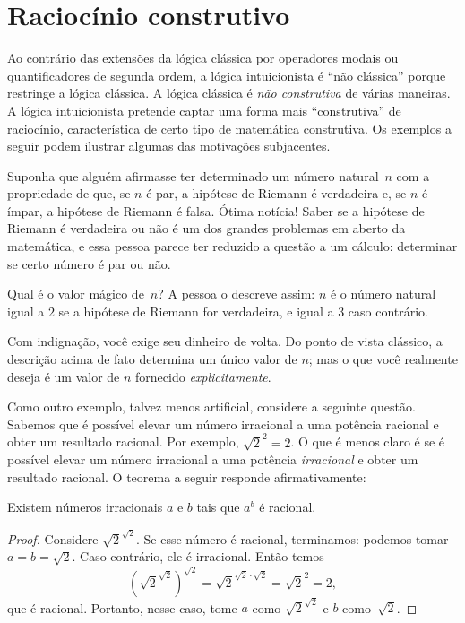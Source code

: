 \documentclass[../../../include/open-logic-chapter]{subfiles}
\begin{document}

\section{Raciocínio construtivo}

Ao contrário das extensões da lógica clássica por operadores modais ou
quantificadores de segunda ordem, a lógica intuicionista é ``não
clássica'' porque restringe a lógica clássica. A lógica clássica é
\emph{não construtiva} de várias maneiras. A lógica intuicionista
pretende captar uma forma mais ``construtiva'' de raciocínio,
característica de certo tipo de matemática construtiva. Os exemplos a
seguir podem ilustrar algumas das motivações subjacentes.

Suponha que alguém afirmasse ter determinado um número natural~$n$ com
a propriedade de que, se $n$ é par, a hipótese de Riemann é verdadeira
e, se $n$ é ímpar, a hipótese de Riemann é falsa. Ótima notícia!{} Saber
se a hipótese de Riemann é verdadeira ou não é um dos grandes problemas
em aberto da matemática, e essa pessoa parece ter reduzido a questão a
um cálculo: determinar se certo número é par ou não.

Qual é o valor mágico de~$n$? A pessoa o descreve assim: $n$ é o número
natural igual a $2$ se a hipótese de Riemann for verdadeira, e igual a
$3$ caso contrário.

Com indignação, você exige seu dinheiro de volta. Do ponto de vista
clássico, a descrição acima de fato determina um único valor de $n$;
mas o que você realmente deseja é um valor de $n$ fornecido
\emph{explicitamente}.

Como outro exemplo, talvez menos artificial, considere a seguinte
questão. Sabemos que é possível elevar um número irracional a uma
potência racional e obter um resultado racional. Por exemplo,
$\sqrt{2}^2 = 2$. O que é menos claro é se é possível elevar um número
irracional a uma potência \emph{irracional} e obter um resultado
racional. O teorema a seguir responde afirmativamente:

\begin{thm}
Existem números irracionais $a$ e $b$ tais que $a^b$ é racional.
\end{thm}

\begin{proof}
Considere $\sqrt{2}^{\sqrt{2}}$. Se esse número é racional, terminamos:
podemos tomar $a = b = \sqrt{2}$. Caso contrário, ele é irracional.
Então temos
\[
(\sqrt{2}^{\sqrt{2}})^{\sqrt{2}} = \sqrt{2}^{\sqrt{2} \cdot
  \sqrt{2}} = \sqrt{2}^2 = 2,
\]
que é racional. Portanto, nesse caso, tome $a$ como
$\sqrt{2}^{\sqrt{2}}$ e $b$ como~$\sqrt 2$.
\end{proof}
\end{document}
